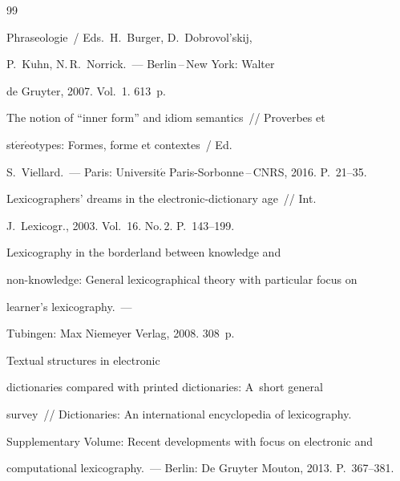 {\small\frenchspacing

{%


\begin{thebibliography}{99}




Phraseologie~/ Eds.\ H.~Burger, D.~Dobrovol'skij, 

P.~K$\ddot{\mbox{u}}$hn, N.\,R.~Norrick.~--- Berlin\,--\,New York: Walter 

de Gruyter, 2007.  Vol.~1. 613~p.


 The notion of ``inner form'' and idiom semantics~/\!\!/ Proverbes et 

st$\acute{\mbox{e}}$r$\acute{\mbox{e}}$otypes: Formes, forme et contextes~/ Ed. 

S.~Viellard.~--- Paris: Universit$\acute{\mbox{e}}$ Paris-Sorbonne\,--\,CNRS, 2016. P.~21--35.




 Lexicographers' dreams in the electronic-dictionary age~/\!\!/ Int. 

J.~Lexicogr., 2003. Vol.~16. No.\,2. P.~143--199.






 Lexicography in the borderland between knowledge and 

non-knowledge: General lexicographical theory with particular focus on 

learner's lexicography.~--- 

T$\ddot{\mbox{u}}$bingen: Max Niemeyer Verlag, 2008. 308~p.




 Textual structures in electronic 

dictionaries compared with printed dictionaries: A~short general 

survey~/\!\!/ Dictionaries: An international encyclopedia of lexicography. 

Supplementary Volume: Recent developments with focus on electronic and 

computational lexicography.~--- Berlin: De Gruyter Mouton, 2013. P.~367--381.




\end{thebibliography}}}

